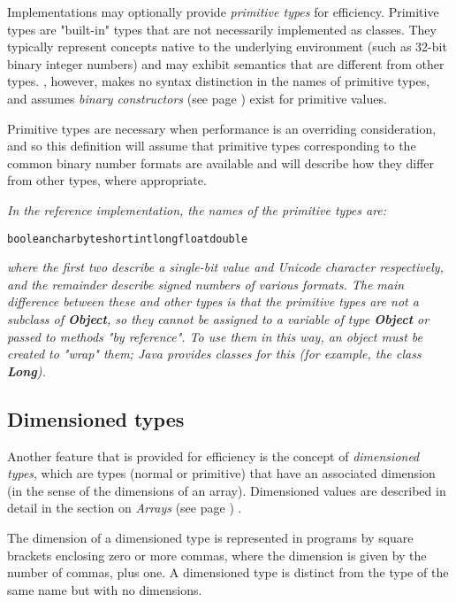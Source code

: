 Implementations may optionally provide \emph{primitive types} for
efficiency.
Primitive types are "built-in" types that are not necessarily
implemented as classes.
They typically represent concepts native to the underlying environment
(such as 32-bit binary integer numbers) and may exhibit semantics that
are different from other types.  \nr{}, however, makes no syntax
distinction in the names of primitive types, and assumes
 \emph{binary constructors} (see page \pageref{refbincon})  exist for primitive
values.
 
Primitive types are necessary when performance is an overriding
consideration, and so this definition will assume that primitive types
corresponding to the common binary number formats are available and will
describe how they differ from other types, where appropriate.
 
\emph{In the reference implementation, the names of the primitive types
are:}
\begin{alltt}
boolean char byte short int long float double
\end{alltt}
\emph{where the first two describe a single-bit value and Unicode
character respectively, and the remainder describe signed numbers of
various formats.
The main difference between these and other types is that the primitive
types are not a subclass of \textbf{Object}, so they cannot be
assigned to a variable of type \textbf{Object} or passed to methods
"by reference".  To use them in this way, an object must be created
to "wrap" them; Java provides classes for this (for example, the
class \textbf{Long}).
}
\subsection{Dimensioned types}\label{refdimtype}
 
Another feature that is provided for efficiency is the concept of
\emph{dimensioned types}, which are types (normal or primitive) that
have an associated dimension (in the sense of the dimensions of an
array).  Dimensioned values are described in detail in the section on
 \emph{Arrays} (see page \pageref{refarray}) .
 
The dimension of a dimensioned type is represented in \nr{} programs
by square brackets enclosing zero or more commas, where the dimension is
given by the number of commas, plus one.  A dimensioned type is distinct
from the type of the same name but with no dimensions.

